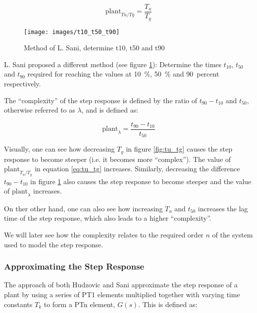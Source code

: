 \begin{equation}
    \textrm{plant}_{Tu/Tg} = \frac{T_u}{T_g}
    \label{eq:tu_tg}
\end{equation}

\begin{figure}
    \texttt{[image: images/t10\_t50\_t90]}
    \caption{Method of L. Sani, determine t10, t50 and t90}
    \label{fig:t10_t50_t90}
\end{figure}

L.  Sani  proposed   a  different  method  (see  figure  \ref{fig:t10_t50_t90}):
Determine the  times  $t_{10}$,  $t_{50}$ and $t_{90}$ required for reaching the
values   at    \SI{10}{\percent},    \SI{50}{\percent}    and   \SI{90}{percent}
respectively.

The   ``complexity''   of  the  step  response  is  defined  by  the  ratio   of
$t_{90}-t_{10}$ and $t_{50}$, otherwise referred to as $\lambda$, and is defined
as:

\begin{equation}
    \textrm{plant}_{\lambda} = \frac{t_{90}-t_{10}}{t_{50}}
    \label{eq:t10_t50_t90}
\end{equation}

Visually, one can  see how decreasing $T_g$ in figure \ref{fig:tu_tg} causes the
step response to become steeper (i.e. it becomes more ``complex''). The value of
$\textrm{plant}_{T_u/T_g}$  in  equation  \ref{eq:tu_tg}  increases.  Similarly,
decreasing the difference $t_{90}-t_{10}$  in  figure \ref{fig:t10_t50_t90} also
causes   the   step   response   to   become    steeper   and   the   value   of
$\textrm{plant}_{\lambda}$ increases.

On ther other hand, one can also see how increasing $T_u$ and $t_{50}$ increases
the  lag time of the step response, which also leads to a higher ``complexity''.

We will later see how the complexity relates to the required  order  $n$  of the
system used to model the step response.


\subsubsection{Approximating the Step Response}

The  approach  of   both   Hudzovic\cite{ref:hudzovic}  and  Sani\cite{ref:sani}
approximate  the  step  response  of a plant by using a series of  PT1  elements
multiplied together with varying time constants  $T_k$  to  form  a PTn element,
$G(s)$. This is defined as:

